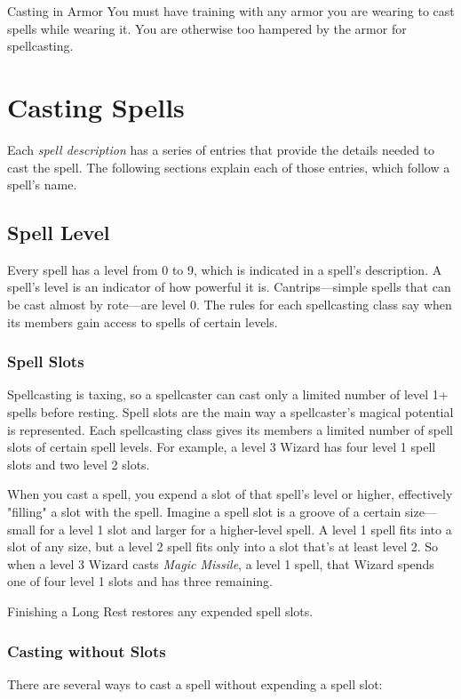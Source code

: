 \documentclass[10pt,a4paper,twoside,bg=print,twocolumn,openany,nodeprecatedcode]{dndbook}
\begin{document}
\begin{DndSidebar}[float=!b]{Casting in Armor}
You must have training with any armor you are wearing to cast spells while wearing it. You are otherwise too hampered by the armor for spellcasting.



\end{DndSidebar}

\section{Casting Spells}
Each \textit{spell description} has a series of entries that provide the details needed to cast the spell. The following sections explain each of those entries, which follow a spell's name.

\subsection{Spell Level}
Every spell has a level from 0 to 9, which is indicated in a spell's description. A spell's level is an indicator of how powerful it is. Cantrips—simple spells that can be cast almost by rote—are level 0. The rules for each spellcasting class say when its members gain access to spells of certain levels.

\subsubsection{Spell Slots}
Spellcasting is taxing, so a spellcaster can cast only a limited number of level 1+ spells before resting. Spell slots are the main way a spellcaster's magical potential is represented. Each spellcasting class gives its members a limited number of spell slots of certain spell levels. For example, a level 3 Wizard has four level 1 spell slots and two level 2 slots.

When you cast a spell, you expend a slot of that spell's level or higher, effectively "filling" a slot with the spell. Imagine a spell slot is a groove of a certain size—small for a level 1 slot and larger for a higher-level spell. A level 1 spell fits into a slot of any size, but a level 2 spell fits only into a slot that's at least level 2. So when a level 3 Wizard casts \textit{Magic Missile}, a level 1 spell, that Wizard spends one of four level 1 slots and has three remaining.

Finishing a Long Rest restores any expended spell slots.

\subsubsection{Casting without Slots}
There are several ways to cast a spell without expending a spell slot:
\end{document}
